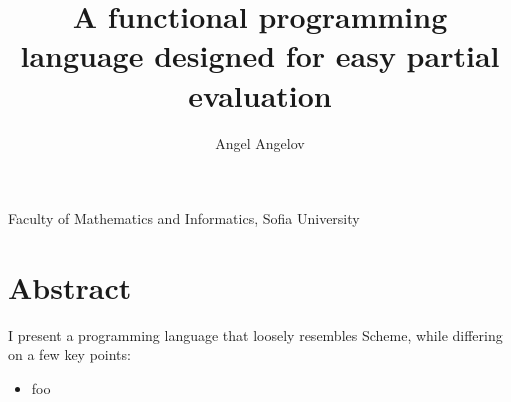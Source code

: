 \documentclass[11pt]{amsart}
\title[Title]{\bf A functional programming language designed for easy partial evaluation}
\author[Angel]{Angel Angelov}
\theoremstyle{definition}
\begin{document}
\maketitle

\begin{center}
Faculty of Mathematics and Informatics, Sofia University
\end{center}

\section*{Abstract}

I present a programming language that loosely resembles Scheme, while
differing on a few key points:
\begin{itemize}
    \item foo
\end{itemize}

%
%
%
%

\bigskip
\end{document}
